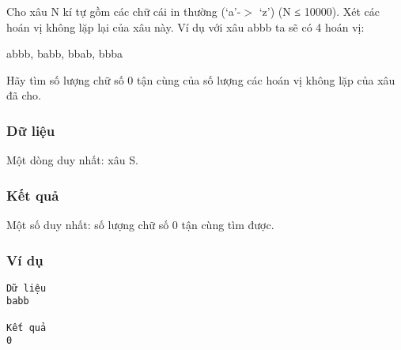 



   Cho xâu N kí tự gồm các chữ cái in thường (‘a’-$>$ ‘z’) (N   ≤ 10000). Xét các hoán vị không lặp lại của xâu này. Ví   dụ với xâu abbb ta sẽ có 4 hoán vị:  

   abbb, babb, bbab, bbba  

   Hãy tìm số lượng chữ số 0 tận cùng của số lượng các   hoán vị không lặp của xâu đã cho.  

\subsubsection{   Dữ liệu  }

   Một dòng duy nhất: xâu S.  

\subsubsection{   Kết quả  }

   Một số duy nhất: số lượng chữ số 0 tận cùng tìm   được.  

\subsubsection{   Ví dụ  }
\begin{verbatim}
Dữ liệu
babb

Kết quả
0
\end{verbatim}